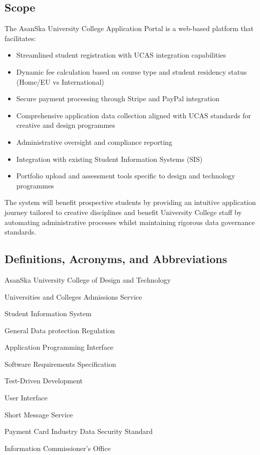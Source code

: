 \documentclass[11pt]{article}
\begin{document}
\subsection{Scope}
The AsanSka University College Application Portal is a web-based platform that facilitates:
\begin{itemize}
    \item Streamlined student registration with UCAS integration capabilities
    \item Dynamic fee calculation based on course type and student residency status (Home/EU vs International)
    \item Secure payment processing through Stripe and PayPal integration
    \item Comprehensive application data collection aligned with UCAS standards for creative and design programmes
    \item Administrative oversight and compliance reporting
    \item Integration with existing Student Information Systems (SIS)
    \item Portfolio upload and assessment tools specific to design and technology programmes
\end{itemize}
The system will benefit prospective students by providing an intuitive application journey tailored to creative disciplines and benefit University College staff by automating administrative processes whilst maintaining rigorous data governance standards.

\subsection{Definitions, Acronyms, and Abbreviations}
\begin{description}[font=\normalfont\sffamily\bfseries,labelwidth=3cm,leftmargin=3.2cm]
    \item[AUCDT] AsanSka University College of Design and Technology
    \item[UCAS] Universities and Colleges Admissions Service
    \item[SIS] Student Information System
    \item[GDPR] General Data protection Regulation
    \item[API] Application Programming Interface
    \item[SRS] Software Requirements Specification
    \item[TDD] Test-Driven Development
    \item[UI] User Interface
    \item[SMS] Short Message Service
    \item[PCI DSS] Payment Card Industry Data Security Standard
    \item[ICO] Information Commissioner's Office
\end{description}
\end{document}
